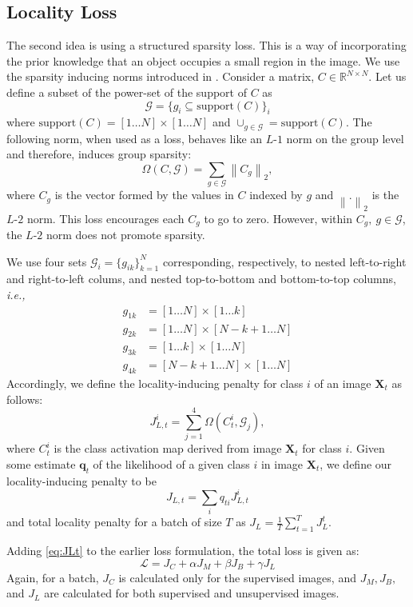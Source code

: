\subsection{Locality Loss}
The second idea is using a structured sparsity loss. This is a way of incorporating the prior knowledge
that an object occupies a small region in the image. We use the sparsity inducing norms introduced in
\cite{groupsparsity,sparsepca}. Consider a matrix, $C \in \mathbb{R}^{N \times
N}$. Let us define a subset of the power-set of the support of $C$ as
\begin{equation}
	\mathcal{G} = \{g_i \subseteq \textrm{support}(C)\}_i
\end{equation}
where $\textrm{support}(C) = [1 \dots N] \times [1 \dots N]$ and $\cup_{g \in \mathcal{G}} = \textrm{support}(C)$. The following norm, when used as a
loss, behaves like an $L$-$1$ norm on the group level and therefore, induces group sparsity:
\begin{equation}
	\Omega (C, \mathcal{G}) = \sum_{g \in \mathcal{G}} \left\lVert C_g \right\rVert _2,
\end{equation}
where $C_g$ is the vector formed by the values in $C$ indexed by $g$ and $\left\lVert . \right\rVert_2$ is
the $L$-$2$ norm. This loss encourages each $C_g$ to go to zero. However, within $C_g,~g
\in \mathcal{G}$, the $L$-$2$ norm does not promote sparsity.

We use four sets $\mathcal G_i = \{g_{ik}\}_{k=1}^N$ corresponding, respectively, to nested
left-to-right and right-to-left colums, and nested top-to-bottom and bottom-to-top columns,
\textit{i.e.,}
\begin{align}
  g_{1k} & = [1 \ldots N] \times [1 \ldots k] \\
  g_{2k} & = [1 \ldots N] \times [N-k+1 \ldots N] \\
  g_{3k} & = [1 \ldots k] \times [1 \ldots N] \\
  g_{4k} & = [N-k+1 \ldots N] \times [1 \ldots N]
\end{align}
Accordingly, we define the locality-inducing penalty for class $i$ of an image $\mathbf{X}_t$ as follows:
\begin{equation} \label{eq:JLt}
	J_{L,t}^{i} = \sum_{j=1}^{4}\Omega(C^i_t, \mathcal G_j),
\end{equation}
where $C^i_{t}$ is the class activation map \cite{CAM} derived from image $\mathbf X_t$ for class
$i$. Given some estimate $\mathbf q_{t}$ of the likelihood of a given class $i$ in image $\mathbf
X_t$, we define our locality-inducing penalty to be
\begin{equation}
  J_{L,t} = \sum_{i} q_{ti} J_{L,t}^i
\end{equation}
and total locality penalty for a batch of size $T$ as $J_L =  \frac{1}{T} \sum_{t=1}^T J_L^t$. 

Adding \eqref{eq:JLt} to the earlier loss formulation, the total loss is given as:
\begin{equation}
	\label{eq:total}
	\mathcal{L} = J_C + \alpha J_M + \beta J_B + \gamma J_L
\end{equation}
Again, for a batch, $J_C$ is calculated only for the supervised images, and $J_M, J_B, $ and $J_L$
are calculated for both supervised and unsupervised images.

